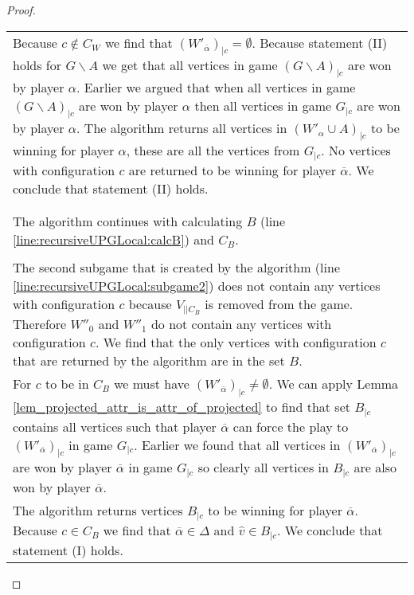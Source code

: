 \begin{theorem}
\begin{proof}
\begin{longtable}{|p{14.2cm}}
			\begin{tabular}{|p{14cm}}
				Assume $(W'_{\overline{\alpha}})_{|\backslash C_W} = \emptyset$ (line \ref{line:recursiveUPGLocal:wopponentwithoutCWisempty})\\
				\hline
				Because $c \notin C_W$ we find that $(W'_{\overline{\alpha}})_{|c} = \emptyset$. Because statement (II) holds for $G\backslash A$ we get that all vertices in game $(G \backslash A)_{|c}$ are won by player $\alpha$. Earlier we argued that when all vertices in game $(G\backslash A)_{|c}$ are won by player $\alpha$ then all vertices in game $G_{|c}$ are won by player $\alpha$. The algorithm returns all vertices in $(W'_\alpha \cup A)_{|c}$ to be winning for player $\alpha$, these are all the vertices from $G_{|c}$. No vertices with configuration $c$ are returned to be winning for player $\overline{\alpha}$. We conclude that statement (II) holds.
			\end{tabular}\\\\
			\begin{tabular}{|p{14cm}}
				Assume $(W'_{\overline{\alpha}})_{|\backslash C_W} \neq \emptyset$ (line \ref{line:recursiveUPGLocal:wopponentwithoutCWisempty})\\
				\hline
				The algorithm continues with calculating $B$ (line \ref{line:recursiveUPGLocal:calcB}) and $C_B$.\\
				\begin{tabular}{|p{13.8cm}}
					Assume $c \in C_B$\\
					\hline
					The second subgame that is created by the algorithm (line \ref{line:recursiveUPGLocal:subgame2}) does not contain any vertices with configuration $c$ because $V_{||C_B}$ is removed from the game. Therefore $W''_0$ and $W''_1$ do not contain any vertices with configuration $c$. We find that the only vertices with configuration $c$ that are returned by the algorithm are in the set $B$.\\
					For $c$ to be in $C_B$ we must have $(W'_{\overline{\alpha}})_{|c} \neq \emptyset$. We can apply Lemma \ref{lem_projected_attr_is_attr_of_projected} to find that set $B_{|c}$ contains all vertices such that player $\overline{\alpha}$ can force the play to $(W'_{\overline{\alpha}})_{|c}$ in game $G_{|c}$. Earlier we found that all vertices in $(W'_{\overline{\alpha}})_{|c}$ are won by player $\overline{\alpha}$ in game $G_{|c}$ so clearly all vertices in $B_{|c}$ are also won by player $\overline{\alpha}$.\\
					The algorithm returns vertices $B_{|c}$ to be winning for player $\overline{\alpha}$. Because $c \in C_B$ we find that $\overline{\alpha} \in \Delta$ and $\hat{v}\in B_{|c}$. We conclude that statement (I) holds.

\end{tabular}
\end{tabular}
\end{longtable}
\end{proof}
\end{theorem}
